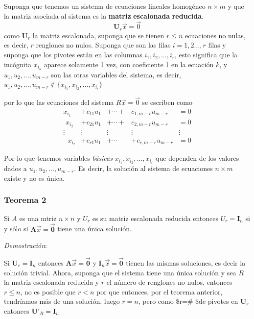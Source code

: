 \documentclass[
]{article}
\begin{document}
Suponga que tenemos un sistema de ecuaciones lineales homogéneo
\(n\times m\) y que la matriz asociada al sistema es la \textbf{matriz}
\textbf{escalonada} \textbf{reducida}. \[
\mathbf{U}_{r}\vec{x} = \vec{0}
\] como \(\mathbf{U}_r\) la matriz escalonada, suponga que se tienen
\(r\leq n\) ecuaciones no nulas, es decir, \(r\) renglones no nulos.
Suponga que son las filas \(i=1,2\ldots,r\) filas y suponga que los
pivotes están en las columnas \(i_1,i_2,\ldots,i_r\), esto significa que
la incógnita \(x_{i_k}\) aparece solamente 1 vez, con coeficiente 1 en
la ecuación \(k\), y \(u_1,u_2,\ldots,u_{m-r}\) son las otras variables
del sistema, es decir,
\(u_1,u_2,\ldots, u_{m-r} \notin\{x_{i_1},x_{i_2},\ldots,x_{i_r}\}\)

por lo que las ecuaciones del sistema \(R\vec{x}=\vec{0}\) se escriben
como \begin{equation}
  \begin{matrix}
      x_{i_1}         & +c_{11} u_1 &  + \cdots +     & c_{1,m-r} u_{m-r}  &= 0  \\
      \,\,x_{i_2}     & +c_{21} u_1 &  + \cdots +     & c_{2,m-r} u_{m-r}  &= 0  \\
    \vdots            & \vdots      &  \vdots        & \vdots & \vdots \\
     \,\,\,\,x_{i_r}  & +c_{r1} u_1 &  + \cdots  & +c_{r,m-r} u_{m-r}  &= 0
  \end{matrix}
\end{equation}

Por lo que tenemos variables \emph{básicas}
\(x_{i_1},x_{i_2},\ldots,x_{i_r}\) que dependen de los valores dados a
\(u_1,u_2,\ldots,u_{m-r}\). Es decir, la solución al sistema de
ecuaciones \(n\times m\) existe y no es única.

\hypertarget{teorema-2-1}{%
\subsubsection{Teorema 2}\label{teorema-2-1}}

Si \(A\) es una mtriz \(n\times n\) y \(U_r\) es su matriz escalonada
reducida entonces \(U_r=\mathbf{I}_n\) si y sólo si
\(\mathbf{A}\vec{x}=\vec{\mathbf{0}}\) tiene una única solución.

\emph{Demostración}:

Si \(\mathbf{U}_r=\mathbf{I}_n\) entonces
\(\mathbf{A}\vec{x}=\vec{\mathbf{0}}\) y
\(\mathbf{I}_n\vec{x}=\vec{\mathbf{0}}\) tienen las mismas soluciones,
es decir la solución trivial. Ahora, suponga que el sistema tiene una
única solución y sea \(R\) la matriz escalonada reducida y \(r\) el
número de renglones no nulos, entonces \(r\leq n\), no es posible que
\(r < n\) por que entonces, por el teorema anterior, tendríamos más de
una solución, luego \(r=n\), pero como \$r=\# \$de pivotes en
\(\mathbf{U}_r\) entonces \(\mathbf{U}'_R=\mathbf{I}_n\)
\end{document}
